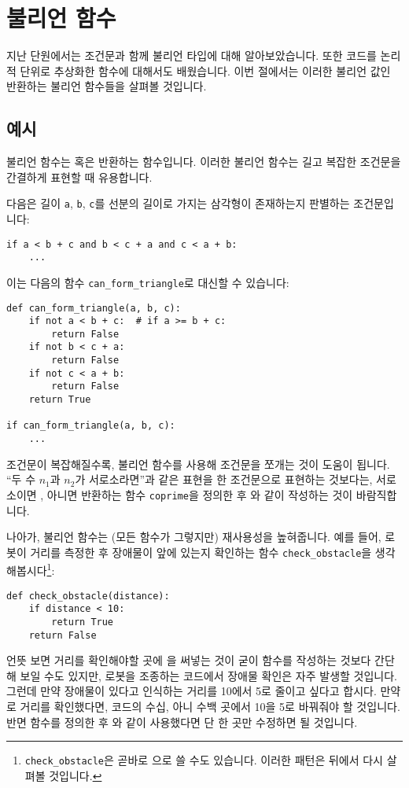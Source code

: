 \documentclass[../main.tex]{subfiles}
\begin{document}
\newcommand{\pytrue}{\pyin{True}}
\newcommand{\pyfalse}{\pyin{False}}

\section{불리언 함수}
지난 단원에서는 조건문과 함께 불리언 타입에 대해 알아보았습니다.
또한 코드를 논리적 단위로 추상화한 함수에 대해서도 배웠습니다.
이번 절에서는 이러한 불리언 값인   반환하는 불리언 함수들을 살펴볼 것입니다.

\subsection{예시}
불리언 함수는 \pytrue 혹은  반환하는 함수입니다.
이러한 불리언 함수는 길고 복잡한 조건문을 간결하게 표현할 때 유용합니다.

다음은 길이 \texttt{a}, \texttt{b}, \texttt{c}를 선분의 길이로 가지는 삼각형이 존재하는지 판별하는 조건문입니다:
\begin{verbatim}
if a < b + c and b < c + a and c < a + b:
    ...
\end{verbatim}
이는 다음의 함수 \verb/can_form_triangle/로 대신할 수 있습니다:
\begin{verbatim}
def can_form_triangle(a, b, c):
    if not a < b + c:  # if a >= b + c:
        return False
    if not b < c + a:
        return False
    if not c < a + b:
        return False
    return True

if can_form_triangle(a, b, c):
    ...
\end{verbatim}

조건문이 복잡해질수록, 불리언 함수를 사용해 조건문을 쪼개는 것이 도움이 됩니다.
``두 수 $n_1$과 $n_2$가 서로소라면''과 같은 표현을 한 조건문으로 표현하는 것보다는, 서로소이면 , 아니면  반환하는 함수 \verb/coprime/을 정의한 후 와 같이 작성하는 것이 바람직합니다.

나아가, 불리언 함수는 (모든 함수가 그렇지만) 재사용성을 높혀줍니다.
예를 들어, 로봇이 거리를 측정한 후 장애물이 앞에 있는지 확인하는 함수 \verb/check_obstacle/을 생각해봅시다\footnote{\texttt{check\_obstacle}은 곧바로 으로 쓸 수도 있습니다. 이러한 패턴은 뒤에서 다시 살펴볼 것입니다.}:
\begin{verbatim}
def check_obstacle(distance):
    if distance < 10:
        return True
    return False
\end{verbatim}
언뜻 보면 거리를 확인해야할 곳에 을 써넣는 것이 굳이 함수를
작성하는 것보다 간단해 보일 수도 있지만, 로봇을 조종하는 코드에서 장애물 확인은
자주 발생할 것입니다.
그런데 만약 장애물이 있다고 인식하는 거리를 10에서 5로 줄이고 싶다고 합시다.
만약 로 거리를 확인했다면, 코드의 수십, 아니 수백 곳에서
10을 5로 바꿔줘야 할 것입니다.
반면 함수를 정의한 후 와 같이 사용했다면 단 한
곳만 수정하면 될 것입니다.
\end{document}
